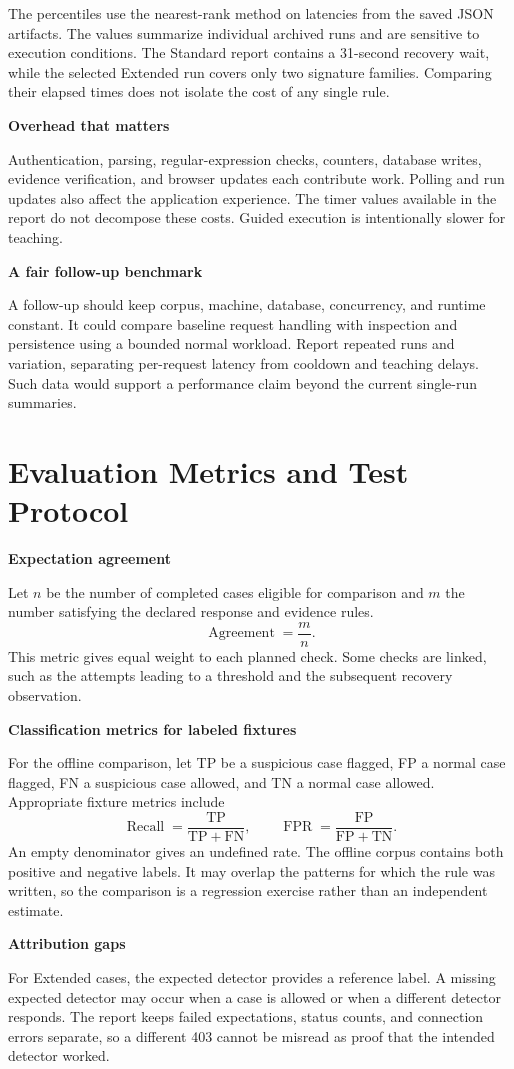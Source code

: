 \documentclass[11pt,a4paper,oneside]{report}
\newcommand{\topic}[1]{\smallskip\noindent\textbf{#1}\par\nobreak\vspace{-.39em}}
\newcommand{\sheet}[1]{\clearpage\section{#1}}
\begin{document}
The percentiles use the nearest-rank method on latencies from the saved JSON artifacts. The values summarize individual archived runs and are sensitive to execution conditions. The Standard report contains a 31-second recovery wait, while the selected Extended run covers only two signature families. Comparing their elapsed times does not isolate the cost of any single rule.

\topic{Overhead that matters}
Authentication, parsing, regular-expression checks, counters, database writes, evidence verification, and browser updates each contribute work. Polling and run updates also affect the application experience. The timer values available in the report do not decompose these costs. Guided execution is intentionally slower for teaching.

\topic{A fair follow-up benchmark}
A follow-up should keep corpus, machine, database, concurrency, and runtime constant. It could compare baseline request handling with inspection and persistence using a bounded normal workload. Report repeated runs and variation, separating per-request latency from cooldown and teaching delays. Such data would support a performance claim beyond the current single-run summaries.

\sheet{Evaluation Metrics and Test Protocol}
\topic{Expectation agreement}
Let $n$ be the number of completed cases eligible for comparison and $m$ the number satisfying the declared response and evidence rules.
\[
 \operatorname{Agreement} = \frac{m}{n}.
\]
This metric gives equal weight to each planned check. Some checks are linked, such as the attempts leading to a threshold and the subsequent recovery observation.

\topic{Classification metrics for labeled fixtures}
For the offline comparison, let TP be a suspicious case flagged, FP a normal case flagged, FN a suspicious case allowed, and TN a normal case allowed. Appropriate fixture metrics include
\[
 \operatorname{Recall}=\frac{\mathrm{TP}}{\mathrm{TP}+\mathrm{FN}},
 \qquad
 \operatorname{FPR}=\frac{\mathrm{FP}}{\mathrm{FP}+\mathrm{TN}}.
\]
An empty denominator gives an undefined rate. The offline corpus contains both positive and negative labels. It may overlap the patterns for which the rule was written, so the comparison is a regression exercise rather than an independent estimate.

\topic{Attribution gaps}
For Extended cases, the expected detector provides a reference label. A missing expected detector may occur when a case is allowed or when a different detector responds. The report keeps failed expectations, status counts, and connection errors separate, so a different 403 cannot be misread as proof that the intended detector worked.
\end{document}
